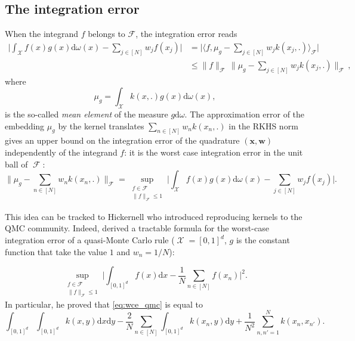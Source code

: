 \documentclass[twoside,11pt]{book}
\numberwithin{theorem}{chapter}
\numberwithin{definition}{chapter}
\numberwithin{proposition}{chapter}
\numberwithin{corollary}{chapter}
\numberwithin{example}{chapter}
\numberwithin{lemma}{chapter}
\DeclareMathOperator{\F}{\mathcal{F}}
\DeclareMathOperator{\X}{\mathcal{X}}
\begin{document}
\subsection{The integration error}
\label{subsec:int_error}
When the integrand $f$ belongs to $\mathcal{F}$, the integration error reads \citep{SmGrSoSc07}
\begin{align}
\label{eq:integral_bound_mean_element}
  \bigg|\int_{\mathcal{X}} f(x)g(x)\mathrm{d}\omega(x) - \sum\limits_{j \in [N]} w_{j}f(x_{j}) \bigg|
  & = \bigg|\langle f, \mu_{g} - \sum\limits_{j \in [N]} w_{j} k(x_{j},.) \rangle_{\mathcal{F}} \bigg|\nonumber\\
  & \leq \|f\|_{\mathcal{F}} \, \Big\|\mu_{g} - \sum\limits_{j \in [N]} w_{j} k(x_{j},.)\Big\|_{\mathcal{F}}\,,
\end{align}
where
\begin{equation}
\mu_{g} = \int_{\mathcal{X}} k(x,.) g(x) \mathrm{d}\omega(x),
\end{equation}
 is the so-called \emph{mean element} \citep{DiPi14,MuFuSrSc17} of the measure $g \mathrm{d}\omega$. The approximation error of the embedding $\mu_{g}$ by the kernel translates $\displaystyle \sum\limits_{n \in [N]} w_{n}k(x_{n},.)$ in the RKHS norm gives an upper bound on the integration error of the quadrature $(\bm{x}, \bm{w})$ independently of the integrand $f$: it is the worst case integration error in the unit ball of $\F$:
\begin{equation}\label{eq:wce_kquadrature}
\|\mu_{g} - \sum\limits_{n \in [N]}w_{n} k(x_{n},.) \|_{\mathcal{F}} = \sup\limits_{\substack{f \in \mathcal{F}\\ \|f\|_{\mathcal{F}} \leq 1}} \bigg|\int_{\mathcal{X}} f(x)g(x)\mathrm{d}\omega(x) - \sum\limits_{j \in [N]} w_{j}f(x_{j}) \bigg|.
\end{equation}





This idea can be tracked to Hickernell \citep{Hic96,Hic98} who introduced reproducing kernels to the QMC community. Indeed, \cite{Hic96} derived a tractable formula for the worst-case integration error of a quasi-Monte Carlo rule ($\X=[0,1]^{d}$, $g$ is the constant function that take the value $1$ and $w_{n}= 1/N$):

\begin{equation}\label{eq:wce_qmc}
 \sup\limits_{\substack{f \in \mathcal{F}\\ \|f\|_{\mathcal{F}} \leq 1}} \bigg|\int_{[0,1]^{d}} f(x)\mathrm{d}x - \frac{1}{N}\sum\limits_{n \in [N]} f(x_{n}) \bigg|^{2}.
\end{equation}
In particular, he proved that \eqref{eq:wce_qmc} is equal to 
\begin{equation}\label{eq:wce_qmc_2}
 \int_{[0,1]^{d}}\int_{[0,1]^{d}} k(x,y) \mathrm{d}x \mathrm{d}y - \frac{2}{N}\sum\limits_{n \in [N]} \int_{[0,1]^{d}} k(x_{n},y) \mathrm{d} y + \frac{1}{N^2}\sum\limits_{n,n'=1}^{N}k(x_{n},x_{n'}).
\end{equation}
\end{document}
